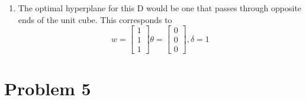 \documentclass[11pt]{article}
\newcommand{\solution}[1]{{{\color{blue}{\bf Solution:} {#1}}}}
\begin{document}
\begin{enumerate}
\item
\solution{} \newline
The optimal hyperplane for this D would be one that passes through opposite ends
of the unit cube. This corresponds to
$$
w = 
\begin{bmatrix}
1 \\
1 \\
1
\end{bmatrix}
 \theta =
\begin{bmatrix}
0 \\
0 \\
0
\end{bmatrix}
, \delta = 1
$$

\end{enumerate}

\newpage

\section{Problem 5}
\end{document}
